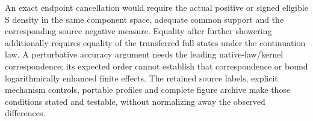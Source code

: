 An exact endpoint cancellation would require the actual positive or
signed eligible S density in the same component space, adequate common
support and the corresponding source negative measure. Equality after
further showering additionally requires equality of the transferred
full states under the continuation law. A perturbative accuracy argument
needs the leading native-law/kernel correspondence; its expected order
cannot establish that correspondence or bound logarithmically enhanced
finite effects. The retained source labels, explicit mechanism controls,
portable profiles and complete figure archive make those conditions
stated and testable, without normalizing away the observed differences.
